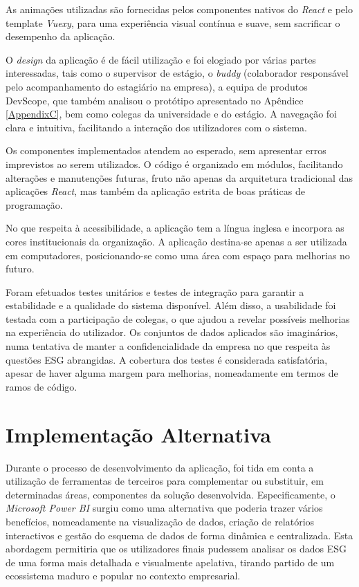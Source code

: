 As animações utilizadas são fornecidas pelos componentes nativos do \textit{React} e pelo template \textit{Vuexy}, para uma experiência visual contínua e suave, sem sacrificar o desempenho da aplicação.

O \textit{design} da aplicação é de fácil utilização e foi elogiado por várias partes interessadas, tais como o supervisor de estágio, o \textit{buddy} (colaborador responsável pelo acompanhamento do estagiário na empresa), a equipa de produtos DevScope, que também analisou o protótipo apresentado no Apêndice \ref{AppendixC}, bem como colegas da universidade e do estágio. A navegação foi clara e intuitiva, facilitando a interação dos utilizadores com o sistema.

Os componentes implementados atendem ao esperado, sem apresentar erros imprevistos ao serem utilizados. O código é organizado em módulos, facilitando alterações e manutenções futuras, fruto não apenas da arquitetura tradicional das aplicações \textit{React}, mas também da aplicação estrita de boas práticas de programação.

No que respeita à acessibilidade, a aplicação tem a língua inglesa e incorpora as cores institucionais da organização. A aplicação destina-se apenas a ser utilizada em computadores, posicionando-se como uma área com espaço para melhorias no futuro.

Foram efetuados testes unitários e testes de integração para garantir a estabilidade e a qualidade do sistema disponível. Além disso, a usabilidade foi testada com a participação de colegas, o que ajudou a revelar possíveis melhorias na experiência do utilizador. Os conjuntos de dados aplicados são imaginários, numa tentativa de manter a confidencialidade da empresa no que respeita às questões ESG abrangidas. A cobertura dos testes é considerada satisfatória, apesar de haver alguma margem para melhorias, nomeadamente em termos de ramos de código.

\section{Implementação Alternativa} 

Durante o processo de desenvolvimento da aplicação, foi tida em conta a utilização de ferramentas de terceiros para complementar ou substituir, em determinadas áreas, componentes da solução desenvolvida. Especificamente, o \textit{Microsoft Power BI} surgiu como uma alternativa que poderia trazer vários benefícios, nomeadamente na visualização de dados, criação de relatórios interactivos e gestão do esquema de dados de forma dinâmica e centralizada. Esta abordagem permitiria que os utilizadores finais pudessem analisar os dados ESG de uma forma mais detalhada e visualmente apelativa, tirando partido de um ecossistema maduro e popular no contexto empresarial.

